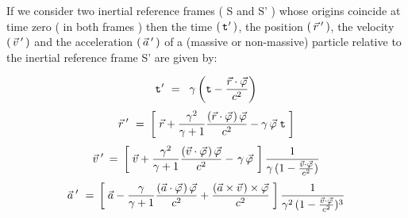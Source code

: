 \documentclass[10pt,fleqn]{article}
\begin{document}
\noindent If we consider two inertial reference frames ( S and S' ) whose origins coincide at time zero ( in both frames ) then the time $( \, \mathtt{t}\hspace{+0.03em}' \, )$, the position $( \, \vec{r}\hspace{+0.18em}' \, )$, the velocity $( \, \vec{v}\hspace{+0.18em}' \, )$ and the acceleration $( \, \vec{a}\hspace{+0.18em}' \, )$ of a (massive or non-massive) particle relative to the inertial reference frame S' are given by:
\par \vspace{+0.21em}
\begin{eqnarray*}
\mathtt{t}\hspace{+0.03em}' ~=~ \hspace{+0.24em} \gamma \left ( \mathtt{t} - \frac{\vec{r} \cdot \vec{\varphi}}{c^2} \right )
\end{eqnarray*}
\vspace{-0.45em}
\begin{eqnarray*}
\vec{r}\hspace{+0.21em}' ~=~ \hspace{-0.09em} \left [ \; \vec{r} + \frac{\gamma^2}{\gamma + 1} \frac{( \vec{r} \cdot \vec{\varphi} \hspace{+0.09em}) \, \vec{\varphi}}{c^2} - \gamma \, \vec{\varphi} \; \mathtt{t} \; \right ]
\end{eqnarray*}
\vspace{-0.30em}
\begin{eqnarray*}
\vec{v}\hspace{+0.21em}' \hspace{-0.12em} ~=~ \hspace{-0.12em} \left [ \; \vec{v} + \frac{\gamma^2}{\gamma + 1} \frac{( \vec{v} \cdot \vec{\varphi} \hspace{+0.09em}) \, \vec{\varphi}}{c^2} - \hspace{+0.114em} \gamma \, \vec{\varphi} \hspace{+0.114em} \; \right ] \frac{1}{\gamma \, ( 1 - \frac{\vec{v} \cdot \vec{\varphi}}{c^2} )}
\end{eqnarray*}
\vspace{-0.30em}
\begin{eqnarray*}
\vec{a}\hspace{+0.21em}' ~=~ \hspace{-0.18em} \left [ \; \vec{a} - \frac{\gamma}{\gamma + 1} \frac{( \vec{a} \cdot \vec{\varphi} \hspace{+0.09em}) \, \vec{\varphi}}{c^2} + \frac{( \vec{a} \times \vec{v} \hspace{+0.09em}) \times \vec{\varphi}}{c^2} \; \right ] \frac{1}{\gamma^2 \, ( 1 - \frac{\vec{v} \cdot \vec{\varphi}}{c^2} )^3}
\end{eqnarray*}
\end{document}
